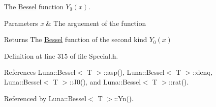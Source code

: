 The \hyperlink{structLuna_1_1Bessel}{Bessel} function $ Y_0(x) $. 


\begin{DoxyParams}{Parameters}
{\em x} & The arguement of the function \\
\hline
\end{DoxyParams}
\begin{DoxyReturn}{Returns}
The \hyperlink{structLuna_1_1Bessel}{Bessel} function of the second kind $ Y_0(x) $ 
\end{DoxyReturn}


Definition at line 315 of file Special.\+h.



References Luna\+::\+Bessel$<$ T $>$\+::asp(), Luna\+::\+Bessel$<$ T $>$\+::denq, Luna\+::\+Bessel$<$ T $>$\+::\+J0(), and Luna\+::\+Bessel$<$ T $>$\+::rat().



Referenced by Luna\+::\+Bessel$<$ T $>$\+::\+Yn().


